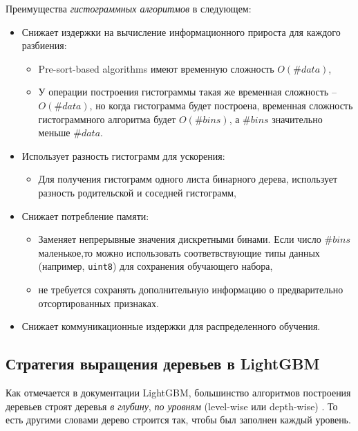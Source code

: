 \documentclass[%
	11pt,
	a4paper,
	utf8,
		]{article}
\begin{document}
Преимущества \emph{гистограммных алгоритмов} в следующем:
\begin{itemize}
	\item Снижает издержки на вычисление информационного прироста для каждого разбиения:
	\begin{itemize}
		\item Pre-sort-based algorithms имеют временную сложность $ O(\#data) $,
		
		\item У операции построения гистограммы такая же временная сложность -- $ O(\#data) $, но когда гистограмма будет построена, временная сложность гистограммного алгоритма будет $ O(\#bins) $, а $ \#bins $ значительно меньше $ \#data $.
	\end{itemize}

    \item Использует разность гистограмм для ускорения:
    \begin{itemize}
    	\item Для получения гистограмм одного листа бинарного дерева, использует разность родительской и соседней гистограмм,
    \end{itemize}

    \item Снижает потребление памяти:
    \begin{itemize}
    	\item Заменяет непрерывные значения дискретными бинами. Если число $ \#bins $ маленькое,то можно использовать соответвствующие типы данных (например, \verb|uint8|) для сохранения обучающего набора,
    	
    	\item не требуется сохранять дополнительную информацию о предварительно отсортированных признаках.
    \end{itemize}

    \item Снижает коммуникационные издержки для распределенного обучения.
\end{itemize}

\subsection{Стратегия выращения деревьев в LightGBM}

Как отмечается в документации LightGBM, большинство алгоритмов построения деревьев строят деревья \emph{в глубину}, \emph{по уровням} (level-wise или depth-wise) . То есть другими словами дерево строится так, чтобы был заполнен каждый уровень.
\end{document}
